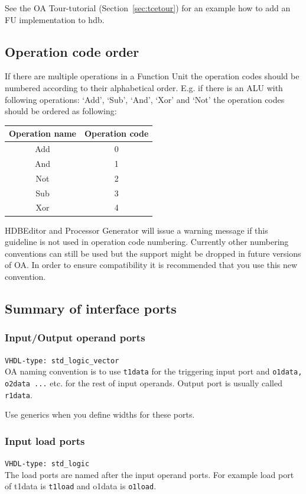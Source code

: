 \documentclass[a4paper,twoside]{tceusermanual}
\begin{document}
See the OA Tour-tutorial (Section~\ref{sec:tcetour}) for an example how to
add an FU implementation to hdb.

\subsection{Operation code order}
\label{sec:opcodeorder}
If there are multiple operations in a Function Unit the operation codes
should be numbered according to their alphabetical order. E.g. if there is
an ALU with following operations: `Add', `Sub', `And', `Xor' and `Not' the
operation codes should be ordered as following:

\begin{tabular}{|c|c|}
 \hline
 Operation name & Operation code \\ \hline
 Add & 0 \\ \hline
 And & 1 \\ \hline
 Not & 2 \\ \hline
 Sub & 3 \\ \hline
 Xor & 4 \\ \hline
\end{tabular}

HDBEditor and Processor Generator will issue a warning message if this
guideline is not used in operation code numbering. Currently other
numbering conventions can still be used but the support might be dropped
in future versions of OA. In order to ensure compatibility it is recommended
that you use this new convention.


\subsection{Summary of interface ports}
\subsubsection{Input/Output operand ports}
\verb|VHDL-type: std_logic_vector| \\
OA naming convention is to use \verb|t1data| for the triggering input port
and \verb|o1data, o2data ...| etc. for the rest of input operands. Output port
is usually called \verb|r1data|.

Use generics when you define widths for these ports.

\subsubsection{Input load ports}
\verb|VHDL-type: std_logic| \\
The load ports are named after the input operand ports. For example load port
of t1data is \verb|t1load| and o1data is \verb|o1load|.
\end{document}
